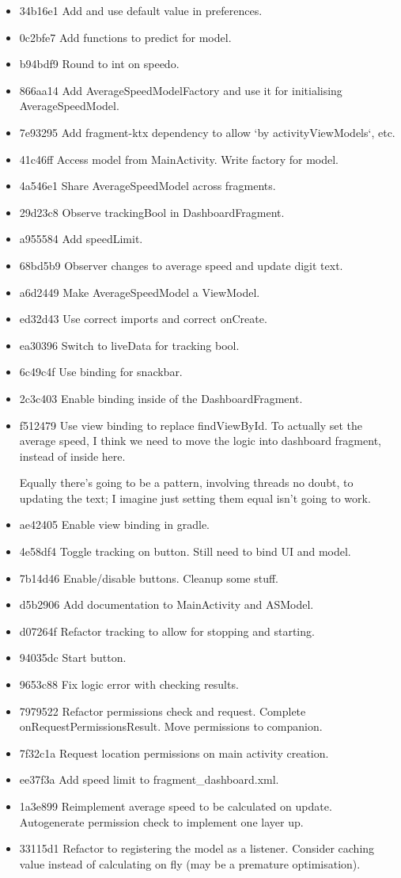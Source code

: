 \documentclass[11pt, a4paper, notitlepage]{report}
\begin{document}
\begin{itemize}
	\item 34b16e1 Add and use default value in preferences. 
	\item 0c2bfe7 Add functions to predict for model. 
	\item b94bdf9 Round to int on speedo. 
	\item 866aa14 Add AverageSpeedModelFactory and use it for initialising AverageSpeedModel. 
	\item 7e93295 Add fragment-ktx dependency to allow `by activityViewModels`, etc. 
	\item 41c46ff Access model from MainActivity. Write factory for model. 
	\item 4a546e1 Share AverageSpeedModel across fragments. 
	\item 29d23c8 Observe trackingBool in DashboardFragment. 
	\item a955584 Add speedLimit. 
	\item 68bd5b9 Observer changes to average speed and update digit text. 
	\item a6d2449 Make AverageSpeedModel a ViewModel. 
	\item ed32d43 Use correct imports and correct onCreate. 
	\item ea30396 Switch to liveData for tracking bool. 
	\item 6c49c4f Use binding for snackbar. 
	\item 2c3c403 Enable binding inside of the DashboardFragment. 
	\item f512479 Use view binding to replace findViewById. To actually set the average speed, I think we need to move the logic into dashboard fragment, instead of inside here.
	
	Equally there's going to be a pattern, involving threads no doubt, to updating the text; I imagine just setting them equal isn't going to work.
	\item ae42405 Enable view binding in gradle. 
	\item 4e58df4 Toggle tracking on button. Still need to bind UI and model. 
	\item 7b14d46 Enable/disable buttons. Cleanup some stuff. 
	\item d5b2906 Add documentation to MainActivity and ASModel. 
	\item d07264f Refactor tracking to allow for stopping and starting. 
	\item 94035dc Start button. 
	\item 9653c88 Fix logic error with checking results. 
	\item 7979522 Refactor permissions check and request. Complete onRequestPermissionsResult. Move permissions to companion. 
	\item 7f32c1a Request location permissions on main activity creation. 
	\item ee37f3a Add speed limit to fragment\_dashboard.xml. 
	\item 1a3e899 Reimplement average speed to be calculated on update. Autogenerate permission check to implement one layer up. 
	\item 33115d1 Refactor to registering the model as a listener. Consider caching value instead of calculating on fly (may be a premature optimisation). 
	

\end{itemize}
\end{document}
